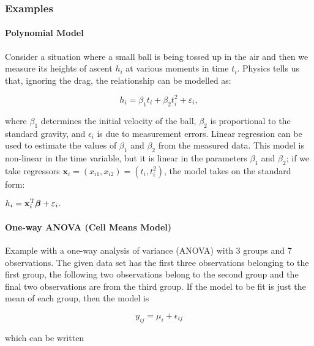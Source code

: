 \subsubsection{Examples}

\paragraph{Polynomial Model}
Consider a situation where a small ball is being tossed up in the air and then we measure its heights of ascent $h_i$ at various moments in time $t_i$. Physics tells us that, ignoring the drag, the relationship can be modelled as:

\begin{equation}
 h_i = \beta_1 t_i + \beta_2 t_i^2 + \varepsilon_i,
\end{equation}

where $\beta_1$ determines the initial velocity of the ball, $\beta_2$ is proportional to the standard gravity, and $\epsilon_i$ is due to measurement errors. Linear regression can be used to estimate the values of $\beta_1$ and $\beta_2$ from the measured data. This model is non-linear in the time variable, but it is linear in the parameters $\beta_1$ and $\beta_2$; if we take regressors $\mathbf{x}_i = (x_{i1},x_{i2}) = (t_i,t_i^2)$, the model takes on the standard form:

 $h_i = \mathbf{x}^{\rm T}_i\boldsymbol\beta + \varepsilon_i.$



\paragraph{One-way ANOVA (Cell Means Model)}
Example with a one-way analysis of variance (ANOVA) with 3 groups and 7 observations. The given data set has the first three observations belonging to the first group, the following two observations belong to the second group and the final two observations are from the third group.
If the model to be fit is just the mean of each group, then the model is

\begin{equation}
  y_{ij} = \mu_i + \epsilon_{ij}
\end{equation}

which can be written

